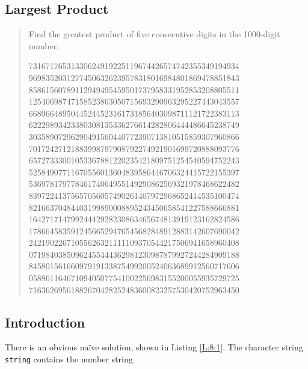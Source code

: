 \documentclass[oneside,12pt]{book}   	%
\newcounter{ex}
\newcounter{pr}
\theoremstyle{definition}
\begin{document}
\begin{spacing}{1.618}
	\chapter{Largest Product}
		\begin{quote}
		Find the greatest product of five consecutive digits in the 1000-digit number.

73167176531330624919225119674426574742355349194934 \\
96983520312774506326239578318016984801869478851843 \\
85861560789112949495459501737958331952853208805511 \\
12540698747158523863050715693290963295227443043557 \\
66896648950445244523161731856403098711121722383113 \\
62229893423380308135336276614282806444486645238749 \\ 
30358907296290491560440772390713810515859307960866 \\
70172427121883998797908792274921901699720888093776 \\
65727333001053367881220235421809751254540594752243 \\
52584907711670556013604839586446706324415722155397 \\
53697817977846174064955149290862569321978468622482 \\
83972241375657056057490261407972968652414535100474 \\
82166370484403199890008895243450658541227588666881 \\
16427171479924442928230863465674813919123162824586 \\
17866458359124566529476545682848912883142607690042 \\
24219022671055626321111109370544217506941658960408 \\
07198403850962455444362981230987879927244284909188 \\
84580156166097919133875499200524063689912560717606 \\
05886116467109405077541002256983155200055935729725 \\
71636269561882670428252483600823257530420752963450 \\
		\end{quote} 
	
		\section{Introduction}
		
			There is an obvious na\"ive solution, shown in Listing \ref{L:8:1}. The character string \texttt{string} contains the number string. 
			

\end{spacing}
\end{document}
